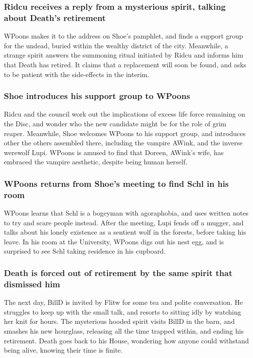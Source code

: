 \subsubsection{\Gls{Ridcu} receives a reply from a mysterious spirit, talking about \Gls{Death}'s
    retirement}
\Gls{WPoons} makes it to the address on \Gls{Shoe}'s pamphlet, and finds a support group for the
undead, buried within the wealthy district of the city. Meanwhile, a strange spirit answers the
summoning ritual initiated by \Gls{Ridcu} and informs him that \Gls{Death} has retired. It claims
that a replacement will soon be found, and asks to be patient with the side-effects in the interim.

\subsubsection{\Gls{Shoe} introduces his support group to \Gls{WPoons}}
\Gls{Ridcu} and the council work out the implications of excess life force remaining on the Disc,
and wonder who the new candidate might be for the role of grim reaper. Meanwhile, \Gls{Shoe}
welcomes \Gls{WPoons} to his support group, and introduces other the others assembled there,
including the vampire \Gls{AWink}, and the inverse werewolf \Gls{Lupi}. \Gls{WPoons} is amused to
find that \Gls{Doreen}, \Gls{AWink}'s wife, has embraced the vampire aesthetic, despite being human
herself.

\subsubsection{\Gls{WPoons} returns from \Gls{Shoe}'s meeting to find \Gls{Schl} in his room}
\Gls{WPoons} learns that \Gls{Schl} is a bogeyman with agoraphobia, and uses written notes to try
and scare people instead. After the meeting, \Gls{Lupi} fends off a mugger, and talks about his
lonely existence as a sentient wolf in the forests, before taking his leave. In his room at the
University, \Gls{WPoons} digs out his nest egg, and is surprised to see \Gls{Schl} taking residence
in his cupboard.

\subsubsection{\Gls{Death} is forced out of retirement by the same spirit that dismissed him}
The next day, \Gls{BillD} is invited by \Gls{Flitw} for some tea and polite conversation. He
struggles to keep up with the small talk, and resorts to sitting idly by watching her knit for
hours. The mysterious hooded spirit visits \Gls{BillD} in the barn, and smashes his new hourglass,
releasing all the time trapped within, and ending his retirement. \Gls{Death} goes back to his
House, wondering how anyone could withstand being alive, knowing their time is finite.


